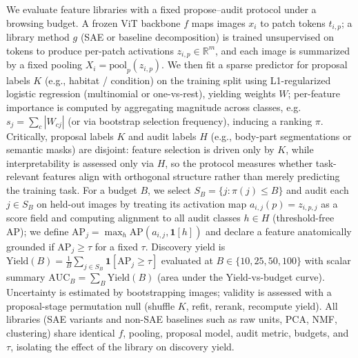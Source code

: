 \documentclass{article}
\theoremstyle{plain}
\theoremstyle{definition}
\theoremstyle{remark}
\begin{document}
We evaluate feature libraries with a fixed propose–audit protocol under a browsing budget.
A frozen ViT backbone $f$ maps images $x_i$ to patch tokens $t_{i,p}$; a library method $g$ (SAE or baseline decomposition) is trained unsupervised on tokens to produce per-patch activations $z_{i,p}\in\mathbb{R}^m$, and each image is summarized by a fixed pooling $X_i=\mathrm{pool}_p(z_{i,p})$.
We then fit a sparse predictor for proposal labels $K$ (e.g., habitat / condition) on the training split using L1-regularized logistic regression (multinomial or one-vs-rest), yielding weights $W$; per-feature importance is computed by aggregating magnitude across classes, e.g. $s_j=\sum_c |W_{c j}|$ (or via bootstrap selection frequency), inducing a ranking $\pi$.
Critically, proposal labels $K$ and audit labels $H$ (e.g., body-part segmentations or semantic masks) are disjoint: feature selection is driven only by $K$, while interpretability is assessed only via $H$, so the protocol measures whether task-relevant features align with orthogonal structure rather than merely predicting the training task.
For a budget $B$, we select $S_B=\{j:\pi(j)\le B\}$ and audit each $j\in S_B$ on held-out images by treating its activation map $a_{i,j}(p)=z_{i,p,j}$ as a score field and computing alignment to all audit classes $h\in H$ (threshold-free AP); we define $\mathrm{AP}_j=\max_h \mathrm{AP}(a_{i,j},\mathbf{1}[h])$ and declare a feature anatomically grounded if $\mathrm{AP}_j\ge\tau$ for a fixed $\tau$.
Discovery yield is $\mathrm{Yield}(B)=\frac{1}{B}\sum_{j\in S_B}\mathbf{1}[\mathrm{AP}_j\ge\tau]$ evaluated at $B\in\{10,25,50,100\}$ with scalar summary $\mathrm{AUC}_B=\sum_B \mathrm{Yield}(B)$ (area under the Yield-vs-budget curve).
Uncertainty is estimated by bootstrapping images; validity is assessed with a proposal-stage permutation null (shuffle $K$, refit, rerank, recompute yield).
All libraries (SAE variants and non-SAE baselines such as raw units, PCA, NMF, clustering) share identical $f$, pooling, proposal model, audit metric, budgets, and $\tau$, isolating the effect of the library on discovery yield.
\end{document}
